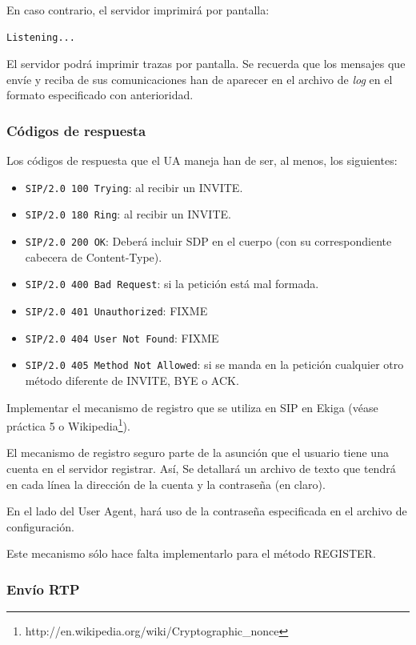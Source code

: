 \documentclass[a4paper,11pt]{article}
\begin{document}
En caso contrario, el servidor imprimirá por pantalla:
\begin{verbatim}
Listening...
\end{verbatim}

El servidor podrá imprimir trazas por pantalla. Se recuerda que 
los mensajes que envíe y reciba de sus comunicaciones han de aparecer
en el archivo de \emph{log} en el formato especificado con anterioridad.

\subsubsection{Códigos de respuesta}

Los códigos de respuesta que el UA maneja han de ser, al menos, los siguientes:

   \begin{itemize}
     \item \texttt{SIP/2.0 100 Trying}: al recibir un INVITE.
     \item \texttt{SIP/2.0 180 Ring}: al recibir un INVITE.
     \item \texttt{SIP/2.0 200 OK}: Deberá incluir SDP en el cuerpo (con su correspondiente cabecera de Content-Type).
     \item \texttt{SIP/2.0 400 Bad Request}: si la petición está mal formada.
     \item \texttt{SIP/2.0 401 Unauthorized}: FIXME
     \item \texttt{SIP/2.0 404 User Not Found}: FIXME
     \item \texttt{SIP/2.0 405 Method Not Allowed}: si se manda en la petición cualquier otro método diferente de INVITE, BYE o ACK.
   \end{itemize}
   
Implementar el mecanismo de registro que se utiliza en SIP en Ekiga (véase práctica 5 o Wikipedia\footnote{http://en.wikipedia.org/wiki/Cryptographic\_nonce}).

El mecanismo de registro seguro parte de la asunción que el usuario tiene una cuenta en el servidor registrar. Así, Se detallará un archivo de texto que tendrá en cada línea la dirección de la cuenta y la contraseña (en claro). 

En el lado del User Agent, hará uso de la contraseña especificada en el archivo de configuración.


Este mecanismo sólo hace falta implementarlo para el método REGISTER.

\subsubsection{Envío RTP}
\end{document}
